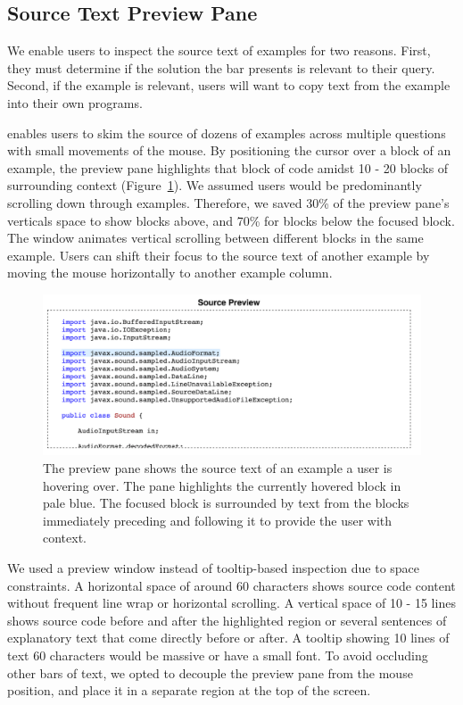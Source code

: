 \subsection{Source Text Preview Pane}

We enable users to inspect the source text of examples for two reasons.
First, they must determine if the solution the bar presents is relevant to their query.
Second, if the example is relevant, users will want to copy text from the example into their own programs.

\systemname{} enables users to skim the source of dozens of examples across multiple questions with small movements of the mouse.
By positioning the cursor over a block of an example, the preview pane highlights that block of code amidst 10 - 20 blocks of surrounding context (Figure~\ref{fig:preview}).
We assumed users would be predominantly scrolling down through examples.
Therefore, we saved 30\% of the preview pane's verticals space to show blocks above, and 70\% for blocks below the focused block.
The window animates vertical scrolling between different blocks in the same example.
Users can shift their focus to the source text of another example by moving the mouse horizontally to another example column.

\begin{figure}[b]
 \centering
 \includegraphics[width=\columnwidth]{figures/preview_pane_selected}
 \caption{The preview pane shows the source text of an example a user is hovering over.
 The pane highlights the currently hovered block in pale blue.
 The focused block is surrounded by text from the blocks immediately preceding and following it to provide the user with context.}
 \label{fig:preview}
\end{figure}

We used a preview window instead of tooltip-based inspection due to space constraints.
A horizontal space of around 60 characters shows source code content without frequent line wrap or horizontal scrolling.
A vertical space of 10 - 15 lines shows source code before and after the highlighted region or several sentences of explanatory text that come directly before or after.
A tooltip showing 10 lines of text 60 characters would be massive or have a small font.
To avoid occluding other bars of text, we opted to decouple the preview pane from the mouse position, and place it in a separate region at the top of the screen.

